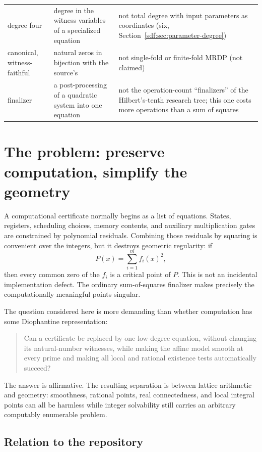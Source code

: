 \documentclass[11pt,a4paper]{article}
\theoremstyle{definition}
\theoremstyle{remark}
\begin{document}
\begin{center}
\begin{longtable}{@{}>{\raggedright\arraybackslash}p{}%
 >{\raggedright\arraybackslash}p{}%
 >{\raggedright\arraybackslash}p{}@{}}
degree four & degree in the witness variables of a specialized equation & not total degree with input parameters as coordinates (six, Section~\ref{sdf:sec:parameter-degree})\\
canonical, witness-faithful & natural zeros in bijection with the source's & not single-fold or finite-fold MRDP (not claimed)\\
finalizer & a post-processing of a quadratic system into one equation & not the operation-count ``finalizers'' of the Hilbert's-tenth research tree; this one costs more operations than a sum of squares\\
\bottomrule
\end{longtable}
\end{center}

\section{The problem: preserve computation, simplify the geometry}\label{sdf:sec:intro}

A computational certificate normally begins as a list of equations. States,
registers, scheduling choices, memory contents, and auxiliary multiplication
gates are constrained by polynomial residuals. Combining those residuals by
squaring is convenient over the integers, but it destroys geometric regularity:
if
\[
 P(x)=\sum_{i=1}^m f_i(x)^2,
\]
then every common zero of the $f_i$ is a critical point of $P$. This is not an
incidental implementation defect. The ordinary sum-of-squares finalizer makes
precisely the computationally meaningful points singular.

The question considered here is more demanding than whether computation has
some Diophantine representation:
\begin{quote}
Can a certificate be replaced by one low-degree equation, without changing
its natural-number witnesses, while making the affine model smooth at every
prime and making all local and rational existence tests automatically succeed?
\end{quote}
The answer is affirmative. The resulting separation is between lattice
arithmetic and geometry: smoothness, rational points, real connectedness, and
local integral points can all be harmless while integer solvability still
carries an arbitrary computably enumerable problem.

\subsection{Relation to the repository}\label{sdf:sec:repo}
\end{document}
